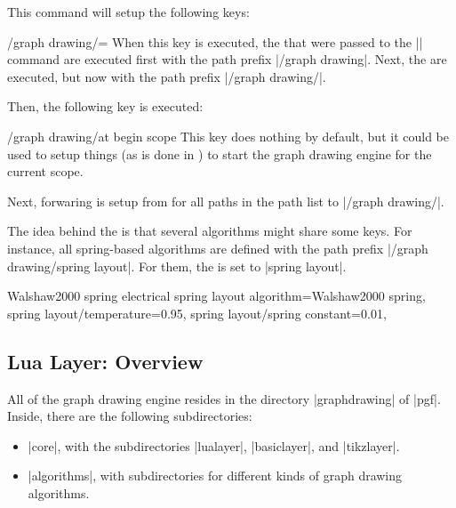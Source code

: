 \begin{command}{\pgfgddeclarealgorithmkey{}}
  This command will setup the following keys:
  
  \begin{key}{/graph drawing/=}
    When this key is executed, the  that were passed to
    the |\pgfgddeclarealgorithmkey| command are executed first with
    the path prefix |/graph drawing|. Next, the 
    are executed, but now with the path prefix
    |/graph drawing/|.

    Then, the following key is executed:
    \begin{key}{/graph drawing/at begin scope}
      This key does nothing by default, but it could be used to setup
      things (as is done in \tikzname) to start the graph drawing
      engine for the current scope. 
    \end{key}
  \end{key}

  Next, forwaring is setup from  for all paths in
  the path list to |/graph drawing/|.
  
  The idea behind the  is that several
  algorithms might share some keys. For
  instance, all spring-based algorithms are defined with the path
  prefix |/graph drawing/spring layout|. For them, the
   is set to |spring layout|.
\begin{codeexample}
\pgfgddeclarealgorithmkey
  {Walshaw2000 spring electrical}
  {spring layout}
  {
    algorithm=Walshaw2000 spring,
    spring layout/temperature=0.95,
    spring layout/spring constant=0.01,
  }    
\end{codeexample}
\end{command}  




\subsection{Lua Layer: Overview}

All of the graph drawing engine resides in the directory
|graphdrawing| of |pgf|. Inside, there are the following
subdirectories:

\begin{itemize}
\item |core|, with the subdirectories |lualayer|, |basiclayer|, and |tikzlayer|.
\item |algorithms|, with subdirectories for different kinds of graph
  drawing algorithms.
\end{itemize}


